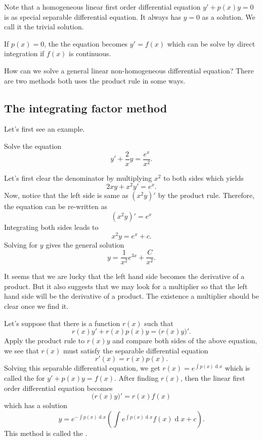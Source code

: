 Note that a homogeneous linear first order differential equation $y'+p(x)y=0$ is as special separable differential equation. It always has $y=0$ as a solution. We call it the trivial solution.

If $p(x)=0$, the the equation becomes $y'=f(x)$ which can be solve by direct integration if $f(x)$ is continuous.

How can we solve a general linear non-homogeneous differential equation? There are two methods both uses the product rule in some ways.

\subsection{The integrating factor method}

Let's first see an example.

\begin{example}
Solve the equation
    \[y'+ \frac{2}{x} y = \frac{e^{x}}{x^2}.\]
\end{example}
\begin{solution}
  Let's first clear the denominator by multiplying $x^2$ to both sides which yields
  \[2xy + x^2 y'=e^{x}.\]
  Now, notice that the left side is same as $\left( x^2 y \right)'$ by the product rule. Therefore, the equation can be re-written as
  \[\left( x^2 y \right)'= e^{x}\]
  Integrating both sides leads to
 \[x^2 y = e^x + c.\]
 Solving for $y$ gives the general solution
 \[y  =  \frac{1}{x^2} e^{3x} + \frac{C}{x^2}.\]
\end{solution}

It seems that we are lucky that the left hand side becomes the derivative of a product. But it also suggests that we may look for a multiplier so that the left hand side will be the derivative of a product. The existence a multiplier should be clear once we find it. 

Let's suppose that there is a function $r(x)$ such that 
\[r(x)y'+r(x)p(x)y=\Big(r(x)y\Big)'.\]
Apply the product rule to $r(x)y$ and compare both sides of the above equation, we see that $r(x)$ must satisfy the separable differential equation
\[r'(x)=r(x)p(x).\]
Solving this separable differential equation, we get $r(x)=e^{\int p(x)\operatorname{d} x}$ which is called the  for $y'+p(x)y=f(x)$.
After finding $r(x)$, then the linear first order differential equation becomes
\[\Big(r(x)y\Big)'=r(x)f(x)\]
which has a solution
\[y={e^{-\int p(x)\operatorname{d} x}}\left(\int e^{\int p(x)\operatorname{d} x}f(x)\operatorname{d} x + c\right).\]
This method is called the .

